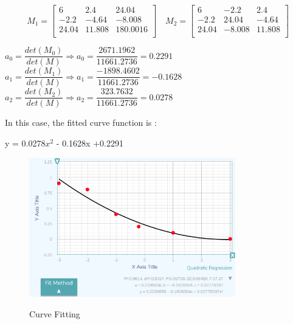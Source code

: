 \[
 M_{1} = \begin{bmatrix}
6 & 2.4 & 24.04 \\
-2.2 & -4.64 & -8.008 \\
24.04 & 11.808 & 180.0016 \\

\end{bmatrix} \quad
 M_{2} = \begin{bmatrix}
6 & -2.2 & 2.4 \\
-2.2 & 24.04 & -4.64 \\
24.04 & -8.008 & 11.808 \\

\end{bmatrix}
\]

$ a_{0} = \dfrac{det(M_{0})}{det(M)}   \Longrightarrow  a_{0} = \dfrac{ 2671.1962}{11661.2736} = 0.2291$  \vfill 
$ a_{1} = \dfrac{det(M_{1})}{det(M)} \Longrightarrow  a_{1} = \dfrac{ -1898.4602}{11661.2736} = -0.1628$  \vfill 
$ a_{2} = \dfrac{det(M_{2})}{det(M)} \Longrightarrow  a_{2} = \dfrac{ 323.7632}{11661.2736} = 0.0278$

In this case, the fitted curve function is : \vfill 
\begin{center}
y = 0.0278$x^{2} $ - 0.1628x +0.2291
\end{center}

\begin{figure}[H]
 \centering
  \includegraphics[width=0.8\textwidth]{./Bilder/Curve_Fitting.png}\label{Curve_Fitting}
  \caption{Curve Fitting\cite{Curve_Fitting_Plot}}
\end{figure}




%




